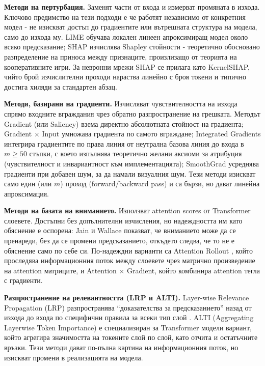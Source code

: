 \documentclass[12pt,a4paper]{report}
\begin{document}
\textbf{Методи на пертурбация.} Заменят части от входа и измерват промяната в изхода. Ключово предимство на тези подходи е че работят независимо от конкретния модел - не изискват достъп до градиентите или вътрешната структура на модела, само до изхода му. LIME \cite{ribeiro2016lime} обучава локален линеен апроксимиращ модел около всяко предсказание; SHAP \cite{lundberg2017shap} изчислява Shapley стойности - теоретично обосновано разпределение на приноса между признаците, произлизащо от теорията на кооперативните игри. За невронни мрежи SHAP се прилага като KernelSHAP, чийто брой изчислителни проходи нараства линейно с броя токени и типично достига хиляди за стандартен абзац.

\textbf{Методи, базирани на градиенти.} Изчисляват чувствителността на изхода спрямо входните вграждания чрез обратно разпространение на грешката. Методът Gradient (или Saliency) \cite{simonyan2014gradient} взема директно абсолютната стойност на градиента; Gradient $\times$ Input умножава градиента по самото вграждане; Integrated Gradients \cite{sundararajan2017ig} интегрира градиентите по права линия от неутрална базова линия до входа в $m \geq 50$ стъпки, с което изпълнява теоретично желани аксиоми за атрибуция (чувствителност и инвариантност към имплементацията); SmoothGrad \cite{smilkov2017smoothgrad} усреднява градиенти при добавен шум, за да намали визуалния шум. Тези методи изискват само един (или $m$) проход (forward/backward pass) и са бързи, но дават линейна апроксимация.

\textbf{Методи на базата на вниманието.} Използват attention scores от Transformer слоевете. Достъпни без допълнителни изчисления, но надеждността им като обяснение е оспорена: Jain и Wallace \cite{jain2019attention} показват, че вниманието може да се пренареди, без да се промени предсказанието, откъдето следва, че то не е обяснение само по себе си. По-надеждни варианти са Attention Rollout \cite{abnar2020quantifying}, който проследява информационния поток между слоевете чрез матрично произведение на attention матриците, и Attention $\times$ Gradient, който комбинира attention тегла с градиенти.

\textbf{Разпространение на релевантността (LRP и ALTI).} Layer-wise Relevance Propagation (LRP) разпространява ``доказателства за предсказанието'' назад от изхода до входа по специфични правила за всеки тип слой \cite{bach2015lrp}. ALTI (Aggregating Layerwise Token Importance) \cite{ferrando2022alti} е специализиран за Transformer модели вариант, който агрегира значимостта на токените слой по слой, като отчита и остатъчните връзки. Тези методи дават по-пълна картина на информационния поток, но изискват промени в реализацията на модела.
\end{document}
